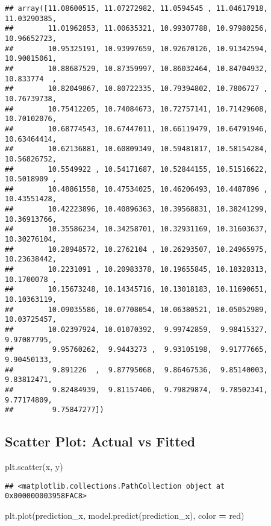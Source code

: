 \documentclass[
]{book}
\newenvironment{Shaded}{\begin{snugshade}}{\end{snugshade}}
\newcommand{\NormalTok}[1]{#1}
\newcommand{\OperatorTok}[1]{\textcolor[rgb]{0.81,0.36,0.00}{\textbf{#1}}}
\newcommand{\StringTok}[1]{\textcolor[rgb]{0.31,0.60,0.02}{#1}}
\begin{document}
\begin{verbatim}
## array([11.08600515, 11.07272982, 11.0594545 , 11.04617918, 11.03290385,
##        11.01962853, 11.00635321, 10.99307788, 10.97980256, 10.96652723,
##        10.95325191, 10.93997659, 10.92670126, 10.91342594, 10.90015061,
##        10.88687529, 10.87359997, 10.86032464, 10.84704932, 10.833774  ,
##        10.82049867, 10.80722335, 10.79394802, 10.7806727 , 10.76739738,
##        10.75412205, 10.74084673, 10.72757141, 10.71429608, 10.70102076,
##        10.68774543, 10.67447011, 10.66119479, 10.64791946, 10.63464414,
##        10.62136881, 10.60809349, 10.59481817, 10.58154284, 10.56826752,
##        10.5549922 , 10.54171687, 10.52844155, 10.51516622, 10.5018909 ,
##        10.48861558, 10.47534025, 10.46206493, 10.4487896 , 10.43551428,
##        10.42223896, 10.40896363, 10.39568831, 10.38241299, 10.36913766,
##        10.35586234, 10.34258701, 10.32931169, 10.31603637, 10.30276104,
##        10.28948572, 10.2762104 , 10.26293507, 10.24965975, 10.23638442,
##        10.2231091 , 10.20983378, 10.19655845, 10.18328313, 10.1700078 ,
##        10.15673248, 10.14345716, 10.13018183, 10.11690651, 10.10363119,
##        10.09035586, 10.07708054, 10.06380521, 10.05052989, 10.03725457,
##        10.02397924, 10.01070392,  9.99742859,  9.98415327,  9.97087795,
##         9.95760262,  9.9443273 ,  9.93105198,  9.91777665,  9.90450133,
##         9.891226  ,  9.87795068,  9.86467536,  9.85140003,  9.83812471,
##         9.82484939,  9.81157406,  9.79829874,  9.78502341,  9.77174809,
##         9.75847277])
\end{verbatim}

\hypertarget{scatter-plot-actual-vs-fitted}{%
\subsection{Scatter Plot: Actual vs Fitted}\label{scatter-plot-actual-vs-fitted}}

\begin{Shaded}
\begin{Highlighting}[]
\NormalTok{plt.scatter(x, y)}
\end{Highlighting}
\end{Shaded}

\begin{verbatim}
## <matplotlib.collections.PathCollection object at 0x000000003958FAC8>
\end{verbatim}

\begin{Shaded}
\begin{Highlighting}[]
\NormalTok{plt.plot(prediction\_x, model.predict(prediction\_x), color }\OperatorTok{=} \StringTok{\textquotesingle{}red\textquotesingle{}}\NormalTok{)}
\end{Highlighting}
\end{Shaded}
\end{document}
